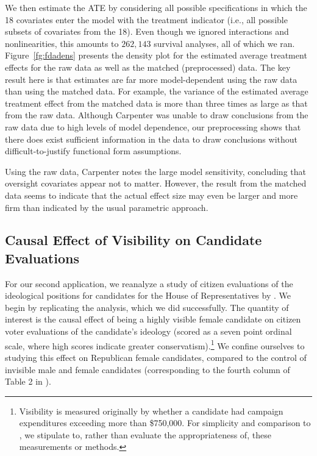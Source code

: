 \documentclass[11pt,titlepage]{article}
\begin{document}
We then estimate the ATE by considering all possible specifications in
which the 18 covariates enter the model with the treatment indicator
(i.e., all possible subsets of covariates from the 18).  Even though
we ignored interactions and nonlinearities, this amounts to $262,143$
survival analyses, all of which we ran. Figure~\ref{fg:fdadens}
presents the density plot for the estimated average treatment effects
for the raw data as well as the matched (preprocessed) data.  The key
result here is that estimates are far more model-dependent using the
raw data than using the matched data.  For example, the variance of
the estimated average treatment effect from the matched data is more
than three times as large as that from the raw data.  Although
Carpenter was unable to draw conclusions from the raw data due to
high levels of model dependence, our preprocessing shows that there
does exist sufficient information in the data to draw conclusions
without difficult-to-justify functional form assumptions.

Using the raw data, Carpenter notes the large model sensitivity,
concluding that oversight covariates appear not to matter.  However,
the result from the matched data seems to indicate that the actual
effect size may even be larger and more firm than indicated by the
usual parametric approach.

\subsection{Causal Effect of Visibility on Candidate
  Evaluations}

For our second application, we reanalyze a study of citizen
evaluations of the ideological positions for candidates for the House
of Representatives by \citet{Koch02}.  We begin by replicating the
analysis, which we did successfully.  The quantity of interest is the
causal effect of being a highly visible female candidate on citizen
voter evaluations of the candidate's ideology (scored as a seven point
ordinal scale, where high scores indicate greater
conservatism).\footnote{Visibility is measured originally by whether a
  candidate had campaign expenditures exceeding more than \$750,000.
  For simplicity and comparison to \citet{Koch02}, we stipulate to,
  rather than evaluate the appropriateness of, these measurements or
  methods.}  We confine ourselves to studying this effect on
Republican female candidates, compared to the control of invisible
male and female candidates (corresponding to the fourth column of
Table 2 in \citet[p.  459]{Koch02}).
\end{document}
